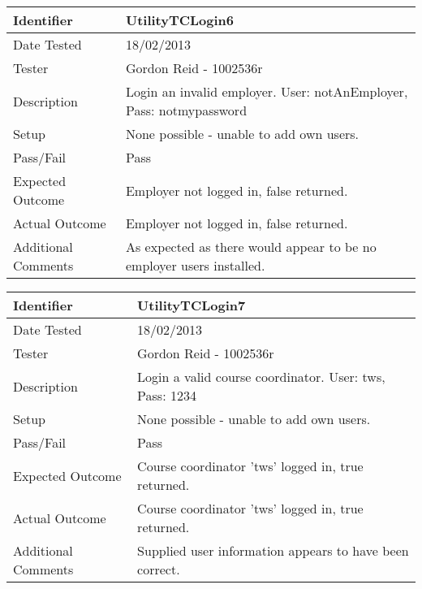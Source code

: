 \documentclass[11pt]{l3deliverable}
\begin{document}
\vspace{2em}

\begin{tabularx}{\textwidth}{|T|L|}
\hline
Identifier & UtilityTCLogin6\\
\hline
Date Tested & 18/02/2013\\
\hline
Tester & Gordon Reid - 1002536r\\
\hline
Description & Login an invalid employer. User: notAnEmployer, Pass: notmypassword\\
\hline
Setup & None possible - unable to add own users.\\
\hline
Pass/Fail & Pass\\
\hline
Expected Outcome & Employer not logged in, false returned.\\
\hline
Actual Outcome & Employer not logged in, false returned.\\
\hline
Additional Comments & As expected as there would appear to be no employer users installed.\\
\hline
\end{tabularx}

\vspace{2em}

\begin{tabularx}{\textwidth}{|T|L|}
\hline
Identifier & UtilityTCLogin7\\
\hline
Date Tested & 18/02/2013\\
\hline
Tester & Gordon Reid - 1002536r\\
\hline
Description & Login a valid course coordinator. User: tws, Pass: 1234\\
\hline
Setup & None possible - unable to add own users.\\
\hline
Pass/Fail & Pass\\
\hline
Expected Outcome & Course coordinator 'tws' logged in, true returned.\\
\hline
Actual Outcome & Course coordinator 'tws' logged in, true returned.\\
\hline
Additional Comments & Supplied user information appears to have been correct.\\
\hline
\end{tabularx}

\vspace{2em}
\end{document}
